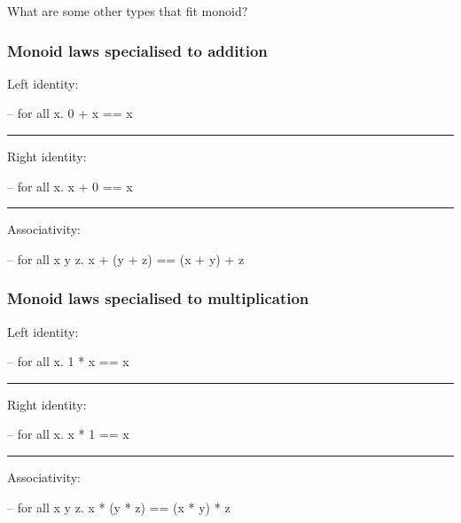 \documentclass[UKenglish,usenames,dvipsnames,svgnames,table,aspectratio=169,mathserif]{beamer}
\newcommand{\textslide}[1]{{
\begin{frame}
\begin{center}

#1

\end{center}
\end{frame}
}}
\begin{document}
\textslide{What are some other types that fit monoid?}


\begin{frame}[fragile]
\frametitle{Monoid laws specialised to addition}
\begin{center}
\begin{minipage}{0.6\textwidth}
Left identity:

\begin{haskellcode}
-- for all x.
0 + x == x
\end{haskellcode}

\hrule
\bigskip

Right identity:

\begin{haskellcode}
-- for all x.
x + 0 == x
\end{haskellcode}

\hrule
\bigskip

Associativity:

\begin{haskellcode}
-- for all x y z.
x + (y + z) == (x + y) + z
\end{haskellcode}

\end{minipage}
\end{center}
\end{frame}


\begin{frame}[fragile]
\frametitle{Monoid laws specialised to multiplication}
\begin{center}
\begin{minipage}{0.6\textwidth}
Left identity:

\begin{haskellcode}
-- for all x.
1 * x == x
\end{haskellcode}

\hrule
\bigskip

Right identity:

\begin{haskellcode}
-- for all x.
x * 1 == x
\end{haskellcode}

\hrule
\bigskip

Associativity:

\begin{haskellcode}
-- for all x y z.
x * (y * z) == (x * y) * z
\end{haskellcode}

\end{minipage}
\end{center}
\end{frame}
\end{document}
